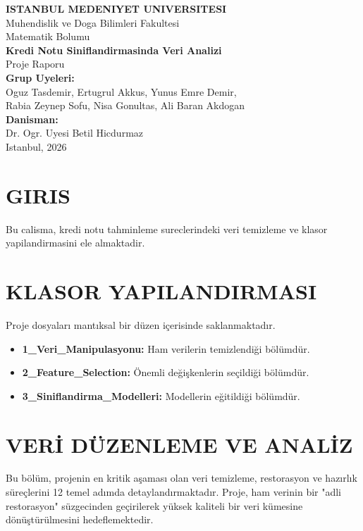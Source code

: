 \documentclass[11pt,a4paper]{article}
\begin{document}
\begin{titlepage}
    \centering
    \vspace*{2cm}
    {\large \textbf{ISTANBUL MEDENIYET UNIVERSITESI}}\\[0.5cm]
    {\large Muhendislik ve Doga Bilimleri Fakultesi}\\[0.5cm]
    {\large Matematik Bolumu}\\[3cm]
    
    {\Large \textbf{Kredi Notu Siniflandirmasinda Veri Analizi}}\\[1.5cm]
    {\large Proje Raporu}\\[3cm]
    
    \textbf{Grup Uyeleri:}\\
    Oguz Tasdemir, Ertugrul Akkus, Yunus Emre Demir,\\
    Rabia Zeynep Sofu, Nisa Gonultas, Ali Baran Akdogan\\[3cm]
    
    \textbf{Danisman:}\\
    Dr. Ogr. Uyesi Betil Hicdurmaz\\[3cm]
    
    \vfill
    Istanbul, 2026
\end{titlepage}

\newpage
\tableofcontents
\newpage

\section{GIRIS}
Bu calisma, kredi notu tahminleme sureclerindeki veri temizleme ve klasor yapilandirmasini ele almaktadir.

\newpage
\section{KLASOR YAPILANDIRMASI}
Proje dosyaları mantıksal bir düzen içerisinde saklanmaktadır.

\begin{itemize}
    \item \textbf{1\_Veri\_Manipulasyonu:} Ham verilerin temizlendiği bölümdür.
    \item \textbf{2\_Feature\_Selection:} Önemli değişkenlerin seçildiği bölümdür.
    \item \textbf{3\_Siniflandirma\_Modelleri:} Modellerin eğitildiği bölümdür.
\end{itemize}

\newpage
\section{VERİ DÜZENLEME VE ANALİZ}
Bu bölüm, projenin en kritik aşaması olan veri temizleme, restorasyon ve hazırlık süreçlerini 12 temel adımda detaylandırmaktadır. Proje, ham verinin bir "adli restorasyon" süzgecinden geçirilerek yüksek kaliteli bir veri kümesine dönüştürülmesini hedeflemektedir.
\end{document}
